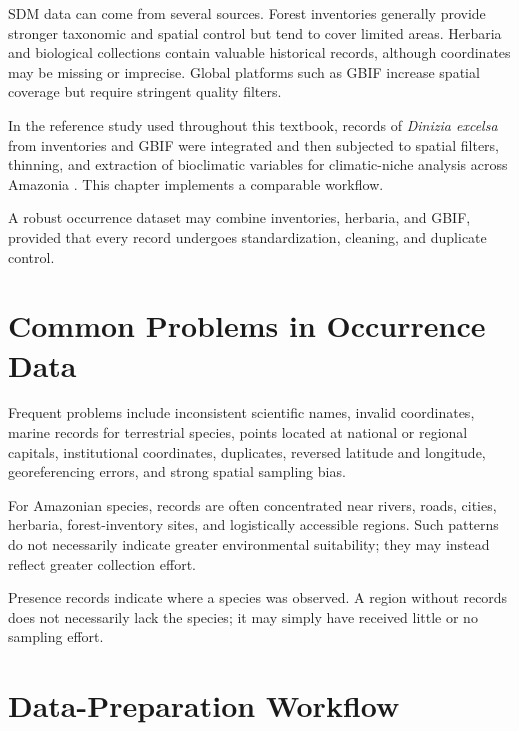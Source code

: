 SDM data can come from several sources. Forest inventories generally provide
stronger taxonomic and spatial control but tend to cover limited areas.
Herbaria and biological collections contain valuable historical records,
although coordinates may be missing or imprecise. Global platforms such as
GBIF increase spatial coverage but require stringent quality filters.

In the reference study used throughout this textbook, records of
\textit{Dinizia excelsa} from inventories and GBIF were integrated and then
subjected to spatial filters, thinning, and extraction of bioclimatic variables
for climatic-niche analysis across Amazonia \parencite{delima2026warmer}. This
chapter implements a comparable workflow.

\begin{dica}[title={\faLightbulb\quad Integrating sources}]
A robust occurrence dataset may combine inventories, herbaria, and GBIF,
provided that every record undergoes standardization, cleaning, and duplicate
control.
\end{dica}

\section{Common Problems in Occurrence Data}

Frequent problems include inconsistent scientific names, invalid coordinates,
marine records for terrestrial species, points located at national or regional
capitals, institutional coordinates, duplicates, reversed latitude and
longitude, georeferencing errors, and strong spatial sampling bias.

For Amazonian species, records are often concentrated near rivers, roads,
cities, herbaria, forest-inventory sites, and logistically accessible regions.
Such patterns do not necessarily indicate greater environmental suitability;
they may instead reflect greater collection effort.

\begin{atencao}[title={\faExclamationTriangle\quad Lack of occurrence is not absence}]
Presence records indicate where a species was observed. A region without
records does not necessarily lack the species; it may simply have received
little or no sampling effort.
\end{atencao}

\section{Data-Preparation Workflow}

